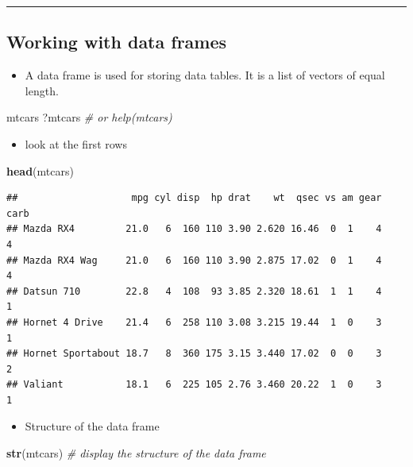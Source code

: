 \documentclass[]{article}
\def\tightlist{}
\newenvironment{Shaded}{\begin{snugshade}}{\end{snugshade}}
\newcommand{\KeywordTok}[1]{\textcolor[rgb]{0.13,0.29,0.53}{\textbf{{#1}}}}
\newcommand{\CommentTok}[1]{\textcolor[rgb]{0.56,0.35,0.01}{\textit{{#1}}}}
\newcommand{\NormalTok}[1]{{#1}}
\numberwithin{equation}{section}
\begin{document}
\begin{center}\rule{0.5\linewidth}{\linethickness}\end{center}

\subsection{Working with data frames}\label{working-with-data-frames-1}

\begin{itemize}
\tightlist
\item
  A data frame is used for storing data tables. It is a list of vectors
  of equal length.
\end{itemize}

\begin{Shaded}
\begin{Highlighting}[]
\NormalTok{mtcars}
\NormalTok{?mtcars       }\CommentTok{# or help(mtcars)}
\end{Highlighting}
\end{Shaded}

\begin{itemize}
\tightlist
\item
  look at the first rows
\end{itemize}

\begin{Shaded}
\begin{Highlighting}[]
\KeywordTok{head}\NormalTok{(mtcars)}
\end{Highlighting}
\end{Shaded}

\begin{verbatim}
##                    mpg cyl disp  hp drat    wt  qsec vs am gear carb
## Mazda RX4         21.0   6  160 110 3.90 2.620 16.46  0  1    4    4
## Mazda RX4 Wag     21.0   6  160 110 3.90 2.875 17.02  0  1    4    4
## Datsun 710        22.8   4  108  93 3.85 2.320 18.61  1  1    4    1
## Hornet 4 Drive    21.4   6  258 110 3.08 3.215 19.44  1  0    3    1
## Hornet Sportabout 18.7   8  360 175 3.15 3.440 17.02  0  0    3    2
## Valiant           18.1   6  225 105 2.76 3.460 20.22  1  0    3    1
\end{verbatim}

\begin{itemize}
\tightlist
\item
  Structure of the data frame
\end{itemize}

\begin{Shaded}
\begin{Highlighting}[]
\KeywordTok{str}\NormalTok{(mtcars) }\CommentTok{# display the structure of the data frame}
\end{Highlighting}
\end{Shaded}
\end{document}
